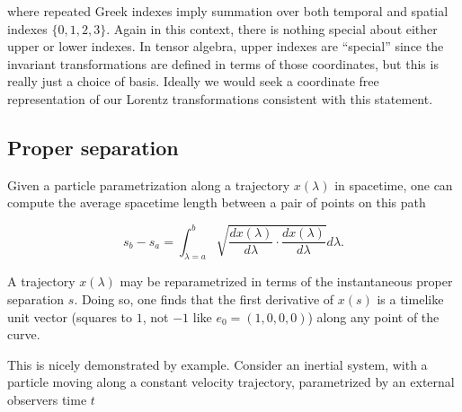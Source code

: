 \documentclass[iop,onecolumn]{emulateapj}
\begin{document}
where repeated Greek indexes imply summation over both temporal and spatial indexes $\{0, 1, 2, 3\}$.  Again in this context, there is nothing special about either upper or lower indexes.  In tensor algebra, upper indexes are ``special'' since the invariant transformations are defined in terms of those coordinates, but this is really just a choice of basis.  Ideally we would seek a coordinate free representation of our Lorentz transformations consistent with this statement.

\subsection{Proper separation}

Given a particle parametrization along a trajectory $x(\lambda)$ in spacetime, one can compute the average spacetime length between a pair of points on this path

\begin{equation}\label{eqn:grahamSchmidtLorentz:400}
s_b - s_a = \int_{\lambda = a}^b \sqrt{ \frac{d x(\lambda)}{d\lambda} \cdot \frac{d x(\lambda)}{d\lambda} } d\lambda.
\end{equation}

%
%
%

A trajectory $x(\lambda)$ may be reparametrized in terms of the instantaneous proper separation $s$.  Doing so, one finds that the first derivative of $x(s)$ is a timelike unit vector (squares to $1$, not $-1$ like $e_0 = (1, 0, 0, 0)$) along any point of the curve.

This is nicely demonstrated by example.
%
%
Consider an inertial system, with a particle moving along a constant velocity trajectory, parametrized by an external observers time $t$
\end{document}
